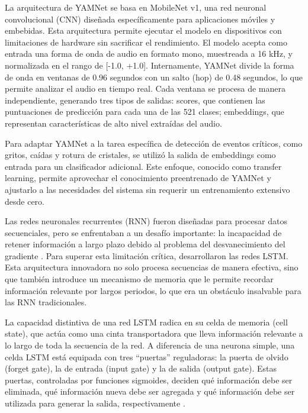 La arquitectura de YAMNet se basa en MobileNet v1, una red neuronal convolucional (CNN) diseñada específicamente para aplicaciones móviles y embebidas. Esta arquitectura permite ejecutar el modelo en dispositivos con limitaciones de hardware sin sacrificar el rendimiento. El modelo acepta como entrada una forma de onda de audio en formato mono, muestreada a 16 kHz, y normalizada en el rango de [-1.0, +1.0]. Internamente, YAMNet divide la forma de onda en ventanas de 0.96 segundos con un salto (hop) de 0.48 segundos, lo que permite analizar el audio en tiempo real. Cada ventana se procesa de manera independiente, generando tres tipos de salidas: scores, que contienen las puntuaciones de predicción para cada una de las 521 clases; embeddings, que representan características de alto nivel extraídas del audio.

Para adaptar YAMNet a la tarea específica de detección de eventos críticos, como gritos, caídas y rotura de cristales, se utilizó la salida de embeddings como entrada para un clasificador adicional. Este enfoque, conocido como transfer learning, permite aprovechar el conocimiento preentrenado de YAMNet y ajustarlo a las necesidades del sistema sin requerir un entrenamiento extensivo desde cero.


Las redes neuronales recurrentes (RNN) fueron diseñadas para procesar datos secuenciales, pero se enfrentaban a un desafío importante: la incapacidad de retener información a largo plazo debido al problema del desvanecimiento del gradiente \cite{heaton2018ian}. Para superar esta limitación crítica, \citeauthor{hochreiter1997long} \citeyear{hochreiter1997long} desarrollaron las redes LSTM. Esta arquitectura innovadora no solo procesa secuencias de manera efectiva, sino que también introduce un mecanismo de memoria que le permite recordar información relevante por largos periodos, lo que era un obstáculo insalvable para las RNN tradicionales.

La capacidad distintiva de una red LSTM radica en su celda de memoria (cell state), que actúa como una cinta transportadora que lleva información relevante a lo largo de toda la secuencia de la red. A diferencia de una neurona simple, una celda LSTM está equipada con tres ``puertas'' reguladoras: la puerta de olvido (forget gate), la de entrada (input gate) y la de salida (output gate). Estas puertas, controladas por funciones sigmoides, deciden qué información debe ser eliminada, qué información nueva debe ser agregada y qué información debe ser utilizada para generar la salida, respectivamente \cite{heaton2018ian}.

